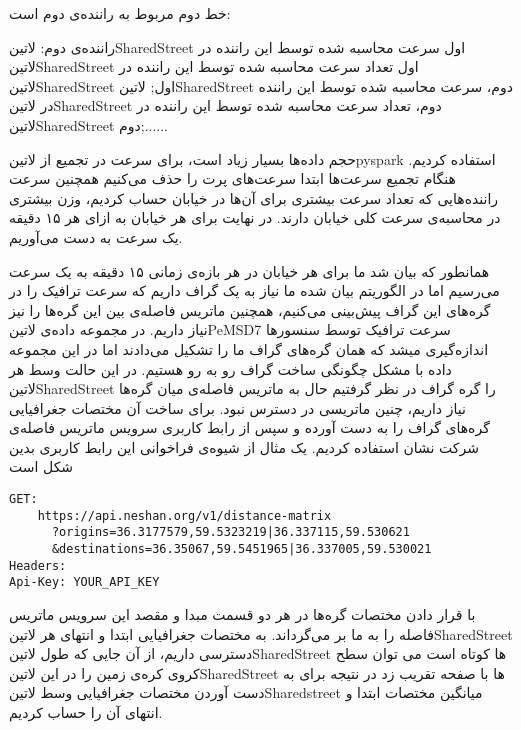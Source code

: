 خط دوم مربوط به راننده‌ی دوم است:

راننده‌ی دوم: ‌لاتین{SharedStreet} اول سرعت محاسبه شده توسط این راننده در ‌لاتین{SharedStreet} اول تعداد سرعت محاسبه شده توسط این راننده در ‌لاتین{SharedStreet} اول;  ‌لاتین{SharedStreet} دوم، سرعت محاسبه شده توسط این راننده در ‌لاتین{SharedStreet} دوم، تعداد سرعت محاسبه شده توسط این راننده در ‌لاتین{SharedStreet} دوم;......

حجم داده‌ها بسیار زیاد است، برای سرعت در تجمیع از ‌لاتین{pyspark} استفاده کردیم. هنگام تجمیع سرعت‌ها ابتدا سرعت‌های پرت را حذف می‌کنیم همچنین سرعت راننده‌هایی که تعداد سرعت بیشتری برای آن‌ها در خیابان حساب کردیم، وزن بیشتری در محاسبه‌ی سرعت کلی خیابان دارند. در نهایت برای هر خیابان به ازای هر ۱۵ دقیقه یک سرعت به دست می‌آوریم.


همانطور که بیان شد ما برای هر خیابان در هر بازه‌ی زمانی ۱۵ دقیقه به یک سرعت می‌رسیم اما در الگوریتم بیان شده ما نیاز به یک گراف داریم که سرعت ترافیک را در گره‌های این گراف پیش‌بینی می‌کنیم، همچنین ماتریس فاصله‌ی بین این گره‌ها را نیز نیاز داریم. در مجموعه داده‌ی ‌لاتین{PeMSD7} سرعت ترافیک توسط سنسورها اندازه‌گیری میشد که همان گره‌های گراف ما را تشکیل می‌دادند اما در این مجموعه داده با مشکل چگونگی ساخت گراف رو به رو هستیم. در این حالت وسط هر ‌لاتین{SharedStreet} را گره گراف در نظر گرفتیم حال به ماتریس فاصله‌ی میان گره‌ها نیاز داریم، چنین ماتریسی در دسترس نبود. برای ساخت آن مختصات جغرافیایی گره‌های گراف را به دست آورده و سپس از رابط کاربری سرویس ماتریس فاصله‌ی شرکت نشان استفاده کردیم. یک مثال از شیوه‌ی فراخوانی این رابط کاربری بدین شکل است

\begin{latin}\begin{lstlisting}
GET:
    https://api.neshan.org/v1/distance-matrix
      ?origins=36.3177579,59.5323219|36.337115,59.530621
      &destinations=36.35067,59.5451965|36.337005,59.530021
Headers:
Api-Key: YOUR_API_KEY
\end{lstlisting}\end{latin}

با قرار دادن مختصات گره‌ها در هر دو قسمت مبدا و مقصد این سرویس ماتریس فاصله را به ما بر می‌گرداند. به مختصات جغرافیایی ابتدا و انتهای هر ‌لاتین{SharedStreet} دسترسی داریم، از آن جایی که طول ‌لاتین{SharedStreet} ها کوتاه است می توان سطح کروی کره‌ی زمین را در این ‌لاتین{SharedStreet} ها با صفحه تقریب زد در نتیجه برای به دست آوردن مختصات جغرافیایی وسط ‌لاتین{Sharedstreet} میانگین مختصات ابتدا و انتهای آن را حساب کردیم.
